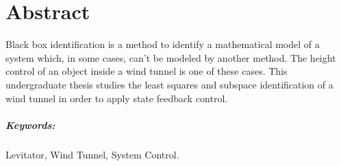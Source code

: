 \chapter*{Abstract}
\thispagestyle{empty}

Black box identification is a method to identify a mathematical model of a system which, in some cases, can't be modeled by another method. The height control of an object inside a wind tunnel is one of these cases. This undergraduate thesis studies the least squares and subspace identification of a wind tunnel in order to apply state feedback control.

\vspace{50pt}

\paragraph{Keywords:} Levitator, Wind Tunnel, System Control.



